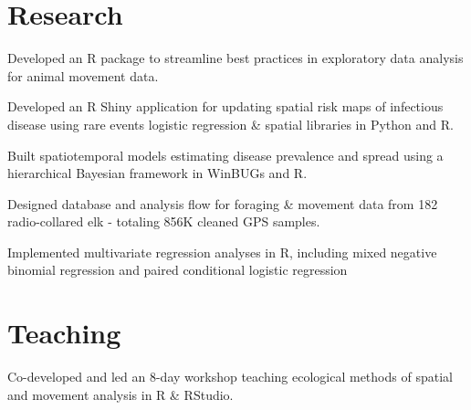 \documentclass[a4]{deedy-resume-openfont}
\begin{document}
\begin{minipage}[t]{0.66\textwidth}
\section{Research}
\location{} %
\begin{tightemize}
\item Developed an R package to streamline best practices in exploratory data analysis for animal movement data.
\item Developed an R Shiny application for updating spatial risk maps of infectious disease using rare events logistic regression \& spatial libraries in Python and R. \href{https://fw-habitat-aep.shinyapps.io/ABCWD_Shiny/}{\faGlobe} \href{https://github.com/dpseidel/ABCWD_Shiny}{\faGithub}
\item Built spatiotemporal models estimating disease prevalence and spread using a hierarchical Bayesian framework in WinBUGs and R.\\
\end{tightemize}
\location{} %
\begin{tightemize}
\item Designed database and analysis flow for foraging \& movement data from 182 radio-collared elk - totaling 856K cleaned GPS samples.
\item Implemented multivariate regression analyses in R, including mixed negative binomial regression and paired conditional logistic regression 
\end{tightemize}
\sectionsep


\section{Teaching}
 
 Co-developed and led an 8-day workshop teaching ecological methods of spatial and movement analysis in R \& RStudio. \href{https://www.danaseidel.com/MovEco-R-Workshop/}{\faGlobe} \href{https://github.com/dpseidel/MovEco-R-Workshop/}{\faGithub} 
\vspace{4pt}


\end{minipage}
\end{document}
